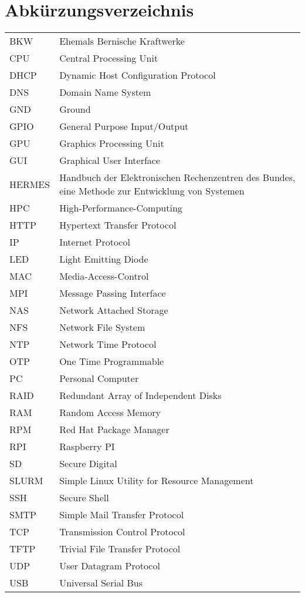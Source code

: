 \section{Abkürzungsverzeichnis}

\begin{table}[H]
\centering
\label{my-label}
\begin{tabular}{p{2cm}p{14cm}}
BKW & Ehemals Bernische Kraftwerke \\
CPU & Central Processing Unit \\
DHCP & Dynamic Host Configuration Protocol \\
DNS & Domain Name System \\
GND & Ground \\
GPIO & General Purpose Input/Output \\
GPU & Graphics Processing Unit \\
GUI & Graphical User Interface \\
HERMES & Handbuch der Elektronischen Rechenzentren des Bundes, eine Methode zur Entwicklung von Systemen \\
HPC & High-Performance-Computing \\
HTTP & Hypertext Transfer Protocol \\
IP & Internet Protocol \\
LED & Light Emitting Diode \\
MAC & Media-Access-Control \\
MPI & Message Passing Interface \\
NAS & Network Attached Storage  \\
NFS & Network File System \\
NTP & Network Time Protocol \\
OTP & One Time Programmable \\
PC & Personal Computer \\
RAID & Redundant Array of Independent Disks \\
RAM & Random Access Memory \\
RPM & Red Hat Package Manager \\
RPI & Raspberry PI \\
SD & Secure Digital \\
SLURM & Simple Linux Utility for Resource Management \\
SSH & Secure Shell  \\
SMTP & Simple Mail Transfer Protocol \\
TCP & Transmission Control Protocol \\
TFTP & Trivial File Transfer Protocol \\
UDP & User Datagram Protocol \\
USB & Universal Serial Bus \\
\end{tabular}
\end{table}
